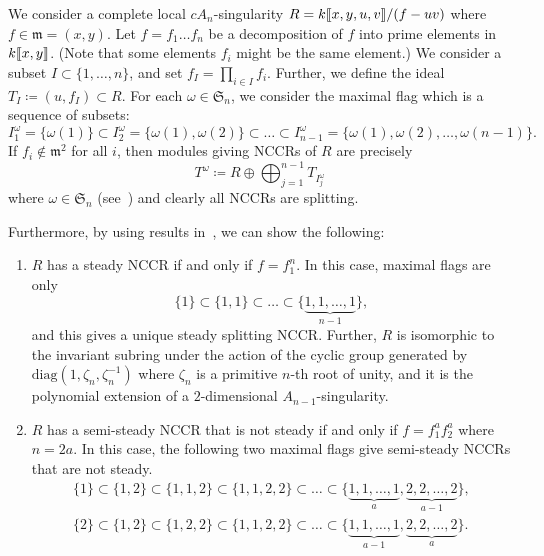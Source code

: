 \documentclass[ALCO,ThmDefs,Unicode]{cedram}
\newcommand{\fkm}{\mathfrak{m}}
\newcommand{\fkS}{\mathfrak{S}}
\newcommand{\llbracket}{\mathopen{[\mkern -2.7mu[}}
\newcommand{\rrbracket}{\mathclose{]\mkern -2.7mu]}}
\begin{document}
\begin{exem}\label{cAn-sing}
We consider a complete local $cA_n$-singularity $R=k\llbracket x,y,u,v\rrbracket /(f-uv)$ where $f\in\fkm=(x,y)$. Let $f=f_1\dots f_n$ be a decomposition of $f$ into prime elements in $k\llbracket x,y\rrbracket $. (Note that some elements $f_i$ might be the same element.) We consider a subset $I\subset\{1,\dots,n\}$, and set $f_I=\prod_{i\in I}f_i$. Further, we define the ideal $T_I\coloneqq (u,f_I)\subset R$. For each $\omega\in\fkS_n$, we consider the maximal flag which is a sequence of subsets:
\[
I_1^\omega=\{\omega(1)\}\subset I_2^\omega=\{\omega(1),\omega(2)\}\subset\dots\subset I_{n-1}^\omega=\{\omega(1),\omega(2),\dots,\omega(n-1)\}.
\]
If $f_i\not\in\fkm^2$ for all $i$, then modules giving NCCRs of $R$ are precisely
\[
T^\omega\coloneqq R\oplus\bigoplus^{n-1}_{j=1}T_{I_j^\omega}
\]
where $\omega\in\fkS_n$ (see~\cite[Theorem~5.1]{IW4})
and clearly all NCCRs are splitting.

Furthermore, by using results in~\cite[Section~5]{IW4}, we can show the following:
\begin{enumerate}%
\item $R$ has a steady NCCR if and only if $f=f_1^n$. In this case, maximal flags are only
\[
\{1\}\subset\{1, 1\}\subset\dots\subset\{\underbrace{1,1,\dots,1}_{n-1}\},
\]
and this gives a unique steady splitting NCCR. Further, $R$ is isomorphic to the invariant subring under the action of the cyclic group generated by $\mathrm{diag}(1,\zeta_n,\zeta^{-1}_n)$ where $\zeta_n$ is a primitive $n$-th root of unity, and it is the polynomial extension of a $2$-dimensional $A_{n-1}$-singularity.
\item $R$ has a semi-steady NCCR that is not steady if and only if $f=f_1^af_2^a$ where $n=2a$. In this case, the following two maximal flags give semi-steady NCCRs that are not steady.
\begin{gather*}
\{1\}\subset\{1,2\}\subset\{1,1,2\}\subset\{1,1,2,2\}\subset\dots\subset\{\underbrace{1,1,\dots,1}_{a},\underbrace{2,2,\dots,2}_{a-1}\},
\\
\{2\}\subset\{1,2\}\subset\{1,2,2\}\subset\{1,1,2,2\}\subset\dots\subset\{\underbrace{1,1,\dots,1}_{a-1},\underbrace{2,2,\dots,2}_{a}\}.
\end{gather*}
\end{enumerate}
\end{exem}
\end{document}

